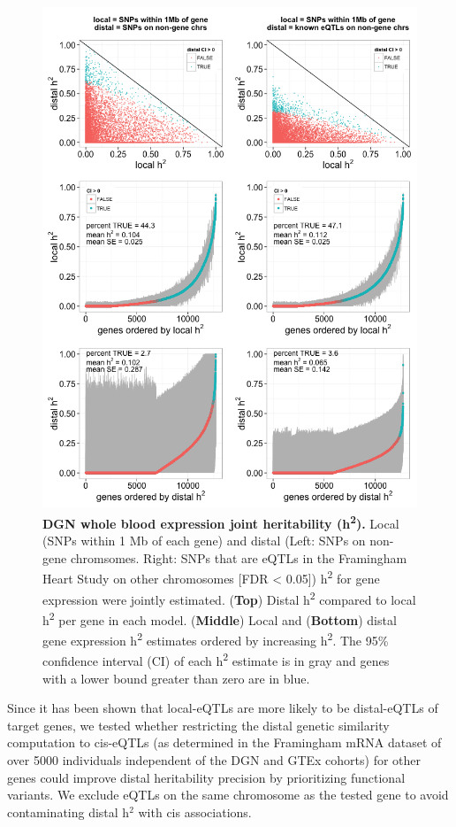 \documentclass[10pt,letterpaper]{article}
\begin{document}
\begin{figure}[h]
\includegraphics[width=12cm]{Figures/Fig-DGN-jt-h2.png}
\caption{{\bf DGN whole blood expression joint heritability
(h\textsuperscript{2}).} Local (SNPs within 1 Mb of each gene) and distal
(Left: SNPs on non-gene chromsomes. Right: SNPs that are eQTLs in the
Framingham Heart Study on other chromosomes {[}FDR \textless{} 0.05{]})
h\textsuperscript{2} for gene expression were jointly estimated.
(\textbf{Top}) Distal h\textsuperscript{2} compared to local
h\textsuperscript{2} per gene in each model. (\textbf{Middle}) Local and
(\textbf{Bottom}) distal gene expression h\textsuperscript{2} estimates
ordered by increasing h\textsuperscript{2}. The 95\% confidence interval
(CI) of each h\textsuperscript{2} estimate is in gray and genes with a
lower bound greater than zero are in blue.}
\label{fig-dgn-jt-h2}
\end{figure}

Since it has been shown that local-eQTLs are more likely to be distal-eQTLs of target genes, we tested whether restricting the distal genetic similarity computation to cis-eQTLs (as determined in the Framingham mRNA dataset of over 5000 individuals \cite{Zhang_2015} independent of the DGN and GTEx cohorts) for other genes could improve distal heritability precision by prioritizing functional variants. We exclude eQTLs on the same chromosome as the tested gene to avoid contaminating distal h$^2$ with cis associations. 
\end{document}
